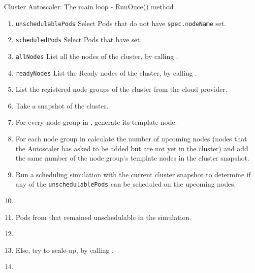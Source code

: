 \begin{algorithm}[H]
  \caption{Cluster Autoscaler: The main loop - RunOnce() method}\label{alg:autoscaler-main-loop}
  \begin{enumerate}[leftmargin=0cm]
    \tightlist
    \item
          \texttt{unschedulablePods} \lar Select Pods that do not have \texttt{spec.nodeName} set.
    \item
          \texttt{scheduledPods} \lar Select Pods that have  set.
    \item
          \texttt{allNodes} \lar List all the nodes of the cluster, by calling .
    \item
          \texttt{readyNodes} \lar List the Ready nodes of the cluster, by calling .

    \item
           \lar List the registered node groups of the cluster from the cloud provider.
    \item
          Take a snapshot of the cluster.
    \item
          For every node group in , generate its template node.
    \item For each node group in  calculate the number of
          upcoming nodes (nodes that the Autoscaler has asked to be added but
          are not yet in the cluster) and add the same number of the node
          group's template nodes in the cluster snapshot.
    \item
          Run a scheduling simulation with the current cluster snapshot to determine if any of the \texttt{unschedulablePods} can be scheduled on the upcoming nodes.
    \item {}
    \item {} \lar Pods from  that remained unschedulable in the simulation.
    \item {}
    \item
          Else, try to scale-up, by calling .
    \item
  \end{enumerate}
\end{algorithm}